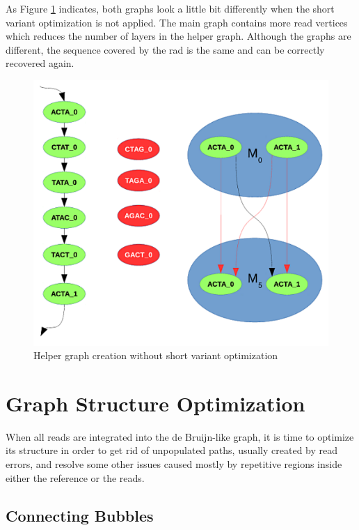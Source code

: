 As Figure \ref{fig:helper-graph} indicates, both graphs look a little bit differently when the short variant optimization is not applied. The main graph contains more read vertices which reduces the number of layers in the helper graph. Although the graphs are different, the sequence covered by the rad is the same and can be correctly recovered again.

\begin{figure}[h]
	\centering
	\includegraphics{img/helper-graph.pdf}
	\caption{Helper graph creation without short variant optimization}
	\label{fig:helper-graph}
\end{figure}

\section{Graph Structure Optimization}
\label{sec:graph-structure-optimization}

When all reads are integrated into the de Bruijn-like graph, it is time to optimize its structure in order to get rid of unpopulated paths, usually created by read errors, and resolve some other issues caused mostly by repetitive regions inside either the reference or the reads.

\subsection{Connecting Bubbles}
\label{subsec:connecting-bubbles}


